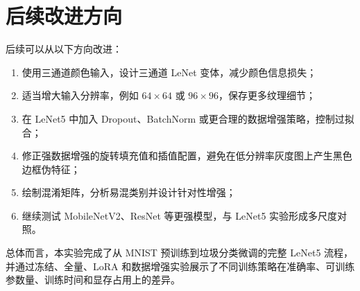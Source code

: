 \section{后续改进方向}

后续可以从以下方向改进：

\begin{enumerate}[label=(\arabic*)]
  \item 使用三通道颜色输入，设计三通道 LeNet 变体，减少颜色信息损失；
  \item 适当增大输入分辨率，例如 $64\times64$ 或 $96\times96$，保存更多纹理细节；
  \item 在 LeNet5 中加入 Dropout、BatchNorm 或更合理的数据增强策略，控制过拟合；
  \item 修正强数据增强的旋转填充值和插值配置，避免在低分辨率灰度图上产生黑色边框伪特征；
  \item 绘制混淆矩阵，分析易混类别并设计针对性增强；
  \item 继续测试 MobileNetV2、ResNet 等更强模型，与 LeNet5 实验形成多尺度对照。
\end{enumerate}

总体而言，本实验完成了从 MNIST 预训练到垃圾分类微调的完整 LeNet5 流程，并通过冻结、全量、LoRA 和数据增强实验展示了不同训练策略在准确率、可训练参数量、训练时间和显存占用上的差异。
